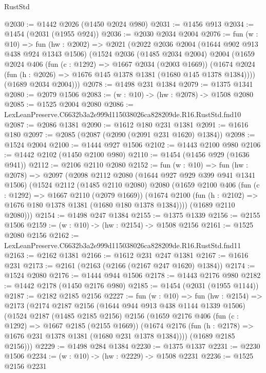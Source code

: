 \begin{lexlean}{RustStd}
\begin{coremodule}
@2030 := @1442 @2026 (@1450 @2024 @980)
@2031 := @1456 @913
@2034 := @1454 (@2031 (@1955 @924))
@2036 := @2030 @2034 @2004
@2076 := fun (w : @10) =>
  fun (hw : @2002) =>
  @2021
    (@2022
      @2036
      @2004
      (@1644 @902 @913 @438 @924 @1343 @1506)
      (@1524
        @2036
        (@1485 @2034 @2004)
        @2004
        (@1659
          @2024
          @406
          (fun (c : @1292) => @1667 @2034 (@2003 @1669))
          (@1674 @2024 (fun (h : @2026) => @1676 @145 @1378 @1381 (@1680 @145 @1378 @1384))))
        (@1689 @2034 @2004)))
@2078 := @1498 @231 @1384
@2079 := @1375 @1341
@2080 := @2079 @1506
@2083 := (w : @10) -> (hw : @2078) -> @1508 @2080
@2085 := @1525 @2004 @2080
@2086 := LexLeanPreserve.C6632b3a2e999d115038026ca828209de.R16.RustStd.fnd10
@2087 := @2086 @1381
@2090 := @1612 @180 @231 @1381
@2091 := @1616 @180
@2097 := @2085 (@2087 (@2090 (@2091 @231 @1620) @1384))
@2098 := @1524 @2004
@2100 := @1444 @927 @1506
@2102 := @1443 @2100 @980
@2106 := @1442 @2102 (@1450 @2100 @980)
@2110 := @1454 (@1456 @929 (@1636 @941))
@2112 := @2106 @2110 @2080
@2152 := fun (w : @10) =>
  fun (hw : @2078) =>
  @2097
    (@2098
      @2112
      @2080
      (@1644 @927 @929 @399 @941 @1341 @1506)
      (@1524
        @2112
        (@1485 @2110 @2080)
        @2080
        (@1659
          @2100
          @406
          (fun (c : @1292) => @1667 @2110 (@2079 @1669))
          (@1674 @2100 (fun (h : @2102) => @1676 @180 @1378 @1381 (@1680 @180 @1378 @1384))))
        (@1689 @2110 @2080)))
@2154 := @1498 @247 @1384
@2155 := @1375 @1339
@2156 := @2155 @1506
@2159 := (w : @10) -> (hw : @2154) -> @1508 @2156
@2161 := @1525 @2080 @2156
@2162 := LexLeanPreserve.C6632b3a2e999d115038026ca828209de.R16.RustStd.fnd11
@2163 := @2162 @1381
@2166 := @1612 @231 @247 @1381
@2167 := @1616 @231
@2173 := @2161 (@2163 (@2166 (@2167 @247 @1620) @1384))
@2174 := @1524 @2080
@2176 := @1444 @944 @1506
@2178 := @1443 @2176 @980
@2182 := @1442 @2178 (@1450 @2176 @980)
@2185 := @1454 (@2031 (@1955 @1144))
@2187 := @2182 @2185 @2156
@2227 := fun (w : @10) =>
  fun (hw : @2154) =>
  @2173
    (@2174
      @2187
      @2156
      (@1644 @944 @913 @438 @1144 @1339 @1506)
      (@1524
        @2187
        (@1485 @2185 @2156)
        @2156
        (@1659
          @2176
          @406
          (fun (c : @1292) => @1667 @2185 (@2155 @1669))
          (@1674 @2176 (fun (h : @2178) => @1676 @231 @1378 @1381 (@1680 @231 @1378 @1384))))
        (@1689 @2185 @2156)))
@2229 := @1498 @284 @1384
@2230 := @1375 @1337
@2231 := @2230 @1506
@2234 := (w : @10) -> (hw : @2229) -> @1508 @2231
@2236 := @1525 @2156 @2231

\end{coremodule}
\end{lexlean}
